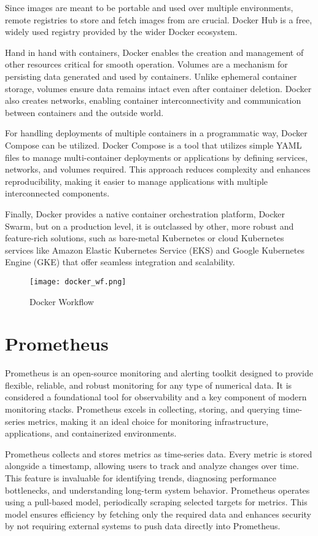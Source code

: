 Since images are meant to be portable and used over multiple environments, remote registries to store and fetch images from are crucial. Docker Hub is a free, widely used registry provided by the wider Docker ecosystem.

Hand in hand with containers, Docker enables the creation and management of other resources critical for smooth operation. Volumes are a mechanism for persisting data generated and used by containers. Unlike ephemeral container storage, volumes ensure data remains intact even after container deletion. Docker also creates networks, enabling container interconnectivity and communication between containers and the outside world.

For handling deployments of multiple containers in a programmatic way, Docker Compose can be utilized. Docker Compose is a tool that utilizes simple YAML files to manage multi-container deployments or applications by defining services, networks, and volumes required. This approach reduces complexity and enhances reproducibility, making it easier to manage applications with multiple interconnected components.

Finally, Docker provides a native container orchestration platform, Docker Swarm, but on a production level, it is outclassed by other, more robust and feature-rich solutions, such as bare-metal Kubernetes or cloud Kubernetes services like Amazon Elastic Kubernetes Service (EKS) and Google Kubernetes Engine (GKE) that offer seamless integration and scalability.\cite{containers_docker}


\begin{figure}[!h]
    \graphicspath{ {./diagrams/} }
    \texttt{[image: docker\_wf.png]}
    \centering
    \caption{Docker Workflow}
    \label{fig:docker_wf}
\end{figure}

\section{Prometheus}
Prometheus is an open-source monitoring and alerting toolkit designed to provide flexible, reliable, and robust monitoring for any type of numerical data. It is considered a foundational tool for observability and a key component of modern monitoring stacks. Prometheus excels in collecting, storing, and querying time-series metrics, making it an ideal choice for monitoring infrastructure, applications, and containerized environments.

Prometheus collects and stores metrics as time-series data. Every metric is stored alongside a timestamp, allowing users to track and analyze changes over time. This feature is invaluable for identifying trends, diagnosing performance bottlenecks, and understanding long-term system behavior. Prometheus operates using a pull-based model, periodically scraping selected targets for metrics. This model ensures efficiency by fetching only the required data and enhances security by not requiring external systems to push data directly into Prometheus.


